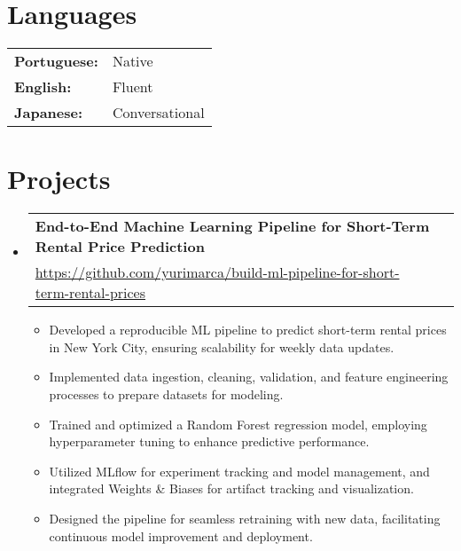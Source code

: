 \documentclass[letterpaper,11pt]{article}
\makeatletter
\newcommand{\resumeProject}[2]{
	\vspace {-1pt}\item
	\begin{tabular*}{0.97\textwidth}{l@{\extracolsep{\fill}}r}
		\textbf{#1}\\
		{\small\href{#2}{#2}} \\
	\end{tabular*}\vspace{-5pt}
}
\newcommand{\resumeSubHeadingListStart}{\begin{itemize}[leftmargin=*]}
\newcommand{\resumeSubHeadingListEnd}{\end{itemize}}
\makeatother
\begin{document}
\section{Languages}

\begin{tabular}{l @{\quad} l}
	\textbf{Portuguese:}&Native\\
	\textbf{English:}&Fluent \\
	\textbf{Japanese:}&Conversational \\
\end{tabular}

\section{Projects}


\resumeSubHeadingListStart
\resumeProject
{End-to-End Machine Learning Pipeline for Short-Term Rental Price Prediction}{https://github.com/yurimarca/build-ml-pipeline-for-short-term-rental-prices}
\begin{itemize}
	\item Developed a reproducible ML pipeline to predict short-term rental prices in New York City, ensuring scalability for weekly data updates.
	\item Implemented data ingestion, cleaning, validation, and feature engineering processes to prepare datasets for modeling.
	\item Trained and optimized a Random Forest regression model, employing hyperparameter tuning to enhance predictive performance.
	\item Utilized MLflow for experiment tracking and model management, and integrated Weights \& Biases for artifact tracking and visualization.
	\item Designed the pipeline for seamless retraining with new data, facilitating continuous model improvement and deployment.
\end{itemize}

\resumeSubHeadingListEnd


\end{document}
